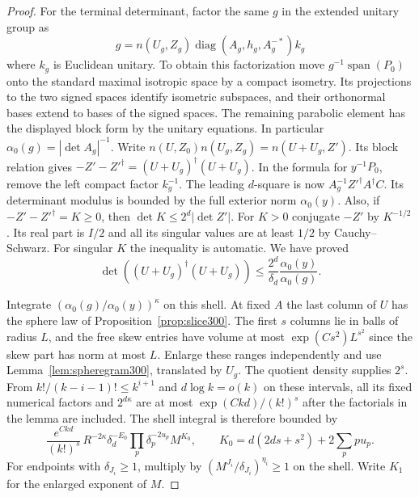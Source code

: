 \documentclass[a4paper,11pt]{article}
\theoremstyle{definition}
\theoremstyle{remark}
\numberwithin{equation}{section}
\begin{document}
\begin{proof}
For the terminal determinant, factor the same \(g\) in the
extended unitary group as
\[
        g=n(U_g,Z_g)\operatorname{diag}(A_g,h_g,A_g^{-*})k_g
\]
where \(k_g\) is Euclidean unitary. To obtain this factorization
move \(g^{-1}\operatorname{span}(P_0)\) onto the standard
maximal isotropic space by a compact isometry. Its projections
to the two signed spaces identify isometric subspaces, and their
orthonormal bases extend to bases of the signed spaces. The
remaining parabolic element has the displayed block form by the
unitary equations. In particular \(\alpha_0(g)=|\det A_g|^{-1}\).
Write \(n(U,Z_0)n(U_g,Z_g)=n(U+U_g,Z')\). Its block relation gives
\(-Z'-Z'^\dagger=(U+U_g)^\dagger(U+U_g)\). In the formula for
\(y^{-1}P_0\), remove the left compact factor \(k_g^{-1}\).
The leading \(d\)-square is now \(A_g^{-1}Z'^\dagger A^\dagger C\).
Its determinant modulus is bounded by the full exterior norm
\(\alpha_0(y)\). Also, if \(-Z'-Z'^\dagger=K\ge0\), then
\(\det K\le 2^d|\det Z'|\). For \(K>0\) conjugate \( -Z'\)
by \(K^{-1/2}\). Its real part is \(I/2\) and all its singular
values are at least \(1/2\) by Cauchy--Schwarz. For singular
\(K\) the inequality is automatic. We have proved
\[
 \det((U+U_g)^\dagger(U+U_g))
       \le \frac{2^d}{\delta_d}\frac{\alpha_0(y)}{\alpha_0(g)} .
\]

Integrate \((\alpha_0(g)/\alpha_0(y))^\kappa\) on this shell.
At fixed \(A\) the last column of \(U\) has the sphere law
of Proposition~\ref{prop:slice300}. The first \(s\) columns
lie in balls of radius \(L\), and the free skew entries have
volume at most \(\exp(Cs^2)L^{s^2}\) since the skew part has
norm at most \(L\). Enlarge these ranges independently and use
Lemma~\ref{lem:spheregram300}, translated by \(U_g\).
The quotient density supplies \(2^s\). From
\(k!/(k-i-1)!\le k^{i+1}\) and \(d\log k=o(k)\) on these
intervals, all its fixed numerical factors and \(2^{d\kappa}\)
are at most \(\exp(Ckd)/(k!)^s\) after the factorials in the
lemma are included. The shell integral is therefore bounded by
\[
 \frac{e^{Ckd}}{(k!)^s}\,
 R^{-2\kappa}\delta_d^{-E_0}\prod_p\delta_p^{-2u_p}
       M^{K_0},\qquad
 K_0=d(2ds+s^2)+2\sum_p p u_p .
\]
For endpoints with \(\delta_{J_i}\ge1\), multiply by
\((M^{J_i}/\delta_{J_i})^{\eta_i}\ge1\) on the shell.
Write \(K_1\) for the enlarged exponent of \(M\).


\end{proof}
\end{document}
